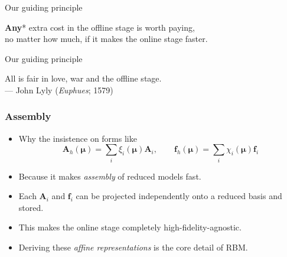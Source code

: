 \documentclass{beamer}
\begin{document}
\begin{frame}
\begin{center}
  \end{center}
\end{frame}

\begin{frame}
  \begin{block}{\centering Our guiding principle}
    \begin{center}
      \vspace{5mm}
      \textbf{Any}* extra cost in the offline stage is worth paying, \\
      no matter how much, if it makes the online stage faster. \\
      \vspace{5mm}
    \end{center}
  \end{block}
\end{frame}

\begin{frame}
  \begin{block}{\centering Our guiding principle}
    \begin{center}
      \vspace{5mm}
      All is fair in love, war and the offline stage. \\
      --- John Lyly (\emph{Euphues}; 1579)
      \vspace{5mm}
    \end{center}
  \end{block}
\end{frame}

\begin{frame}
  \frametitle{Assembly}

  \begin{itemize}
  \item Why the insistence on forms like
    \[
      \bm A_h(\bm \mu) = \textstyle \sum_i \xi_i(\bm \mu) \bm A_i, \qquad
      \bm f_h(\bm \mu) = \textstyle \sum_i \chi_i(\bm \mu) \bm f_i
    \]
  \item Because it makes \emph{assembly} of reduced models fast.
  \item Each $\bm A_i$ and $\bm f_i$ can be projected independently onto a reduced basis and stored.
  \item This makes the online stage completely high-fidelity-agnostic.
  \item Deriving these \emph{affine representations} is the core detail of RBM.
  \end{itemize}
\end{frame}
\end{document}
